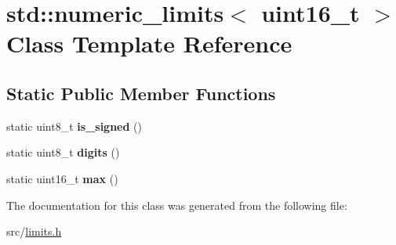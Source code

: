 \hypertarget{classstd_1_1numeric__limits_3_01uint16__t_01_4}{}\section{std\+:\+:numeric\+\_\+limits$<$ uint16\+\_\+t $>$ Class Template Reference}
\label{classstd_1_1numeric__limits_3_01uint16__t_01_4}
\subsection*{Static Public Member Functions}
\begin{DoxyCompactItemize}
\item 
\hypertarget{classstd_1_1numeric__limits_3_01uint16__t_01_4_afb86f68ec1ed3973f6112457d8fa25bb}{}\label{classstd_1_1numeric__limits_3_01uint16__t_01_4_afb86f68ec1ed3973f6112457d8fa25bb} 
static uint8\+\_\+t {\bfseries is\+\_\+signed} ()
\item 
\hypertarget{classstd_1_1numeric__limits_3_01uint16__t_01_4_af8baf757e5505a7ee8c78f1e5f98f285}{}\label{classstd_1_1numeric__limits_3_01uint16__t_01_4_af8baf757e5505a7ee8c78f1e5f98f285} 
static uint8\+\_\+t {\bfseries digits} ()
\item 
\hypertarget{classstd_1_1numeric__limits_3_01uint16__t_01_4_ac51d5d78ead4199574e0831c136ca395}{}\label{classstd_1_1numeric__limits_3_01uint16__t_01_4_ac51d5d78ead4199574e0831c136ca395} 
static uint16\+\_\+t {\bfseries max} ()
\end{DoxyCompactItemize}


The documentation for this class was generated from the following file\+:\begin{DoxyCompactItemize}
\item 
src/\hyperlink{limits_8h}{limits.\+h}\end{DoxyCompactItemize}
